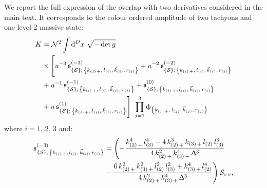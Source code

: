 We report the full expression of the overlap with two derivatives considered in the main text.
It corresponds to the colour ordered amplitude of two tachyons and one level-2 massive state:
\begin{equation}
  \begin{split}
    K
    & = 
    \mathcal{N}^2
    \int \dd[D]{x}\,
    \sqrt{-\det g}
    \\
    & \times
    \Biggl[
      u^{-3}\, \mathfrak{s}^{(-3)}_{\qty{\ensuremath{\mathcal{S}}};\, \qty{k_{\qty(i)\, +},\, l_{\qty(i)},\, \vec{k}_{\qty(i)},\, r_{\qty(i)}}}
      +
      u^{-2}\, \mathfrak{s}^{(-2)}_{\qty{\ensuremath{\mathcal{S}}};\, \qty{k_{\qty(i)\, +},\, l_{\qty(i)},\, \vec{k}_{\qty(i)},\, r_{\qty(i)}}}
      \\
      & +
      u^{-1}\, \mathfrak{s}^{(-1)}_{\qty{\ensuremath{\mathcal{S}}};\, \qty{k_{\qty(i)\, +},\, l_{\qty(i)},\, \vec{k}_{\qty(i)},\, r_{\qty(i)}}}
      +
      \mathfrak{s}^{(0)}_{\qty{\ensuremath{\mathcal{S}}};\, \qty{k_{\qty(i)\, +},\, l_{\qty(i)},\, \vec{k}_{\qty(i)},\, r_{\qty(i)}}}
      \\
      & +
      u\, \mathfrak{s}^{(1)}_{\qty{\ensuremath{\mathcal{S}}};\, \qty{k_{\qty(i)\, +},\, l_{\qty(i)},\, \vec{k}_{\qty(i)},\, r_{\qty(i)}}}
    \Biggr]~
    \prod_{j = 1}^3 \upphi_{\qty{k_{\qty(j)\, +},\, l_{\qty(j)},\, \vec{k}_{\qty(j)},\, r_{\qty(j)}}}
  \end{split}
\end{equation}
where $i = 1,\, 2,\, 3$ and:
\begin{equation}
  \begin{split}
    \ffs^{(-3)}_{\qty{\cS},\, \kmkrN{i}}
    & =
    \Biggl(
        -
        \frac{%
          k_{\qty(2)\, +}^4\, l_{\qty(3)}^4
          -
          4\, k_{\qty(2)\, +}^3\, k_{\qty(3)\, +}\, l_{\qty(2)}\, l_{\qty(3)}^3
        }{%
          4\, k_{\qty(2)\, +}^2\, k_{\qty(3)\, +}^4\, \Delta^3
        }
        \\
        & -
        \frac{%
          6\, k_{\qty(2)\, +}^2\, k_{\qty(3)\, +}^2\, l_{\qty(2)}^2\,l_{\qty(3)}^2 + k_{\qty(3)\, +}^4\, l_{\qty(2)}^4
        }{%
          4\, k_{\qty(2)\, +}^2\, k_{\qty(3)\, +}^4\, \Delta^3
        }
    \Biggr)\,
    \cS_{v\, v},
  \end{split}
\end{equation}

